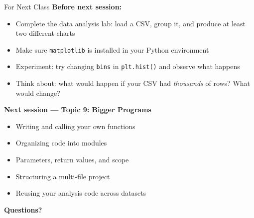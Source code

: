 \documentclass{csbeamer}
\begin{document}
\begin{frame}{For Next Class}
    \textbf{Before next session:}
    \begin{itemize}
        \item Complete the data analysis lab: load a CSV, group it, and produce at least two different charts
        \item Make sure \texttt{matplotlib} is installed in your Python environment
        \item Experiment: try changing \texttt{bins} in \texttt{plt.hist()} and observe what happens
        \item Think about: what would happen if your CSV had \textit{thousands} of rows? What would change?
    \end{itemize}

    \vspace{1em}

    \textbf{Next session --- Topic 9: Bigger Programs}
    \begin{itemize}
        \item Writing and calling your own \textcolor{marigold}{functions}
        \item Organizing code into \textcolor{stfxblue}{modules}
        \item Parameters, return values, and scope
        \item Structuring a multi-file project
        \item Reusing your analysis code across datasets
    \end{itemize}

    \vspace{0.8em}

    \begin{center}
        \textbf{Questions?}
    \end{center}
\end{frame}
\end{document}
